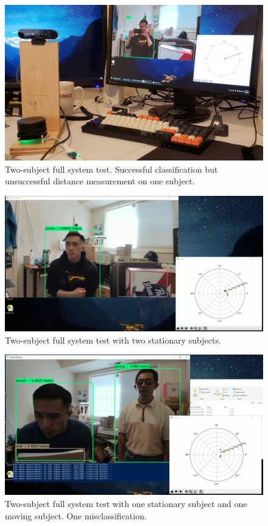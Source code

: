 \documentclass[onecolumn, draftclsnofoot,10pt, compsoc]{IEEEtran}
\makeatletter
\newcommand\captionof[1]{\def\@captype{#1}\caption}
\makeatother
\begin{document}
\begin{singlespace}
		\begin{figure}[H]
		\includegraphics[scale=0.15]{final3.jpg}
		\captionof{figure}{Two-subject full system test. Successful classification but unsuccessful distance measurement on one subject.}
		\label{final3}
		\end{figure}

		\begin{figure}[H]
		\includegraphics[scale=0.4]{final2.PNG}
		\captionof{figure}{Two-subject full system test with two stationary subjects.}
		\label{final2}
		\end{figure}

		\begin{figure}[H]
		\includegraphics[scale=0.4]{final1.PNG}
		\captionof{figure}{Two-subject full system test with one stationary subject and one moving subject. One misclassification.}
		\label{final1}
		\end{figure}


\end{singlespace}
\end{document}
